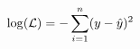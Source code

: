 \documentclass[preview]{standalone}
\begin{document}
\begin{align*}
\special{dvisvgm:raw <g id='unique000'>}\log(\mathcal{L})=-\sum^n_{i=1}(y-\hat{y})^2\special{dvisvgm:raw </g>}
\end{align*}
\end{document}

